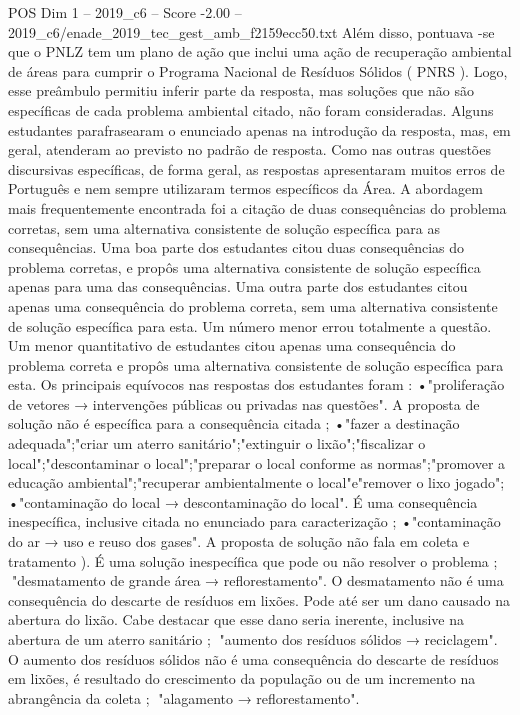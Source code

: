 \begin{textsample}{POS Dim 1 – 2019\_c6 – Score -2.00 – 2019\_c6/enade\_2019\_tec\_gest\_amb\_f2159ecc50.txt}
Além disso, pontuava -se que o PNLZ tem um plano de ação que inclui uma ação de recuperação ambiental de áreas para cumprir o Programa Nacional de Resíduos Sólidos ( PNRS ).
Logo, esse preâmbulo permitiu inferir parte da resposta, mas soluções que não são específicas de cada problema ambiental citado, não foram consideradas.
Alguns estudantes parafrasearam o enunciado apenas na introdução da resposta, mas, em geral, atenderam ao previsto no padrão de resposta.
Como nas outras questões discursivas específicas, de forma geral, as respostas apresentaram muitos erros de Português e nem sempre utilizaram termos específicos da Área.
A abordagem mais frequentemente encontrada foi a citação de duas consequências do problema corretas, sem uma alternativa consistente de solução específica para as consequências.
Uma boa parte dos estudantes citou duas consequências do problema corretas, e propôs uma alternativa consistente de solução específica apenas para uma das consequências.
Uma outra parte dos estudantes citou apenas uma consequência do problema correta, sem uma alternativa consistente de solução específica para esta.
Um número menor errou totalmente a questão.
Um menor quantitativo de estudantes citou apenas uma consequência do problema correta e propôs uma alternativa consistente de solução específica para esta.
Os principais equívocos nas respostas dos estudantes foram : •"proliferação de vetores → intervenções públicas ou privadas nas questões".
A proposta de solução não é específica para a consequência citada ; •"fazer a destinação adequada";"criar um aterro sanitário";"extinguir o lixão";"fiscalizar o local";"descontaminar o local";"preparar o local conforme as normas";"promover a educação ambiental";"recuperar ambientalmente o local"e"remover o lixo jogado"; •"contaminação do local → descontaminação do local".
É uma consequência inespecífica, inclusive citada no enunciado para caracterização ; •"contaminação do ar → uso e reuso dos gases".
A proposta de solução não fala em coleta e tratamento ).
É uma solução inespecífica que pode ou não resolver o problema ; "desmatamento de grande área → reflorestamento".
O desmatamento não é uma consequência do descarte de resíduos em lixões.
Pode até ser um dano causado na abertura do lixão.
Cabe destacar que esse dano seria inerente, inclusive na abertura de um aterro sanitário ; "aumento dos resíduos sólidos → reciclagem".
O aumento dos resíduos sólidos não é uma consequência do descarte de resíduos em lixões, é resultado do crescimento da população ou de um incremento na abrangência da coleta ; "alagamento → reflorestamento".

\end{textsample}

